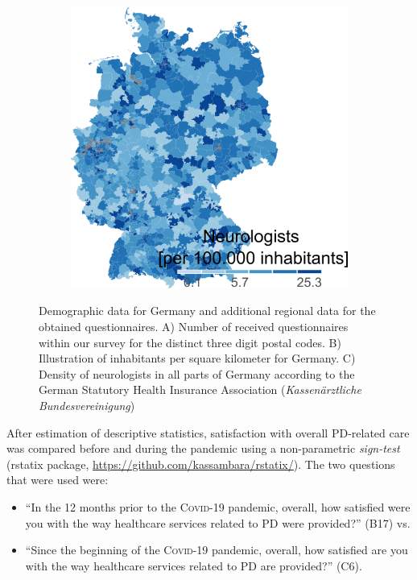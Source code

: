 \documentclass[a4paper,oneside,11pt,english]{scrartcl}
\begin{document}
\begin{figure}[h!]
\begin{subfigure}[b]{0.35\linewidth}
		\label{fig1:population}
	\end{subfigure}%
	\begin{subfigure}[b]{0.35\linewidth}
		\includegraphics[width=.90\textwidth]{fig1c.neurologist_density.v1.0.png}
		\label{fig1:neurologists}
	\end{subfigure}%
	\caption{Demographic data for Germany and additional regional data for the obtained questionnaires. A) Number of received questionnaires within our survey for the distinct three digit postal codes. B) Illustration of inhabitants per square kilometer for Germany. C) Density of neurologists in all parts of Germany according to the German Statutory Health Insurance Association (\textit{Kassenärztliche Bundesvereinigung})}
	\label{fig1:total}
\end{figure}

After estimation of descriptive statistics, satisfaction with overall \textsc{PD}-related care was compared before and during the pandemic using a non-parametric \textit{sign-test} (rstatix package, \url{https://github.com/kassambara/rstatix/}). The two questions that were used were: 
\begin{itemize}
	\item ``In the 12 months prior to the  \textsc{Covid}-19 pandemic, overall, how satisfied were you with the way healthcare services related to \textsc{PD} were provided?'' (B17) vs.
	\item ``Since the beginning of the \textsc{Covid}-19 pandemic, overall, how satisfied are you with the way healthcare services related to \textsc{PD} are provided?'' (C6).
\end{itemize}
\end{document}
